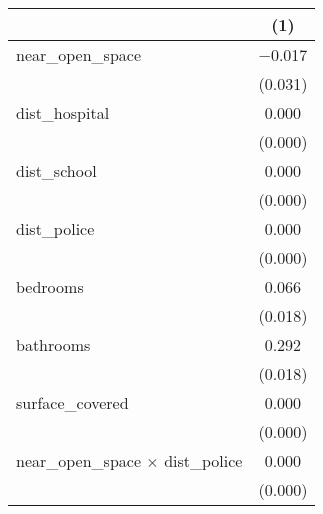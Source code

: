 \begin{table}
\centering
\begin{tabular}[t]{lc}
\toprule
  & (1)\\
\midrule
near\_open\_space & \num{-0.017}\\
 & (\num{0.031})\\
dist\_hospital & \num{0.000}\\
 & (\num{0.000})\\
dist\_school & \num{0.000}\\
 & (\num{0.000})\\
dist\_police & \num{0.000}\\
 & (\num{0.000})\\
bedrooms & \num{0.066}\\
 & (\num{0.018})\\
bathrooms & \num{0.292}\\
 & (\num{0.018})\\
surface\_covered & \num{0.000}\\
 & (\num{0.000})\\
near\_open\_space × dist\_police & \num{0.000}\\
 & (\num{0.000})\\
\bottomrule
\end{tabular}
\end{table}
